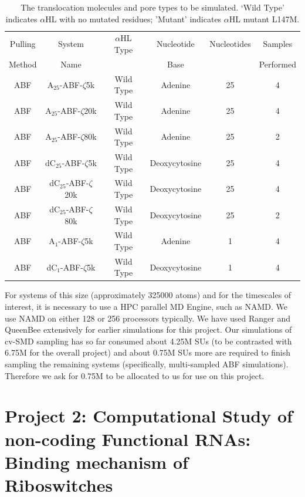 \documentclass[a4paper,10pt]{article}
\newcommand{\dctfnsp}{dC$_{25}$}
\newcommand{\atfnsp}{A$_{25}$}
\newcommand{\dconsp}{dC$_{1}$}
\newcommand{\aonsp}{A$_{1}$}
\newcommand{\ahl}{$\alpha$HL }
\begin{document}
\begin{table}[!h]
\begin{center}
  \caption{The translocation molecules and pore types to be simulated. `Wild Type' indicates \ahl with no mutated residues; 'Mutant' indicates \ahl mutant L147M.\newline }
\label{table:systems2}
\begin{tabular}{| c | c | c | c | c | c |}
\hline
Pulling & System & \ahl Type & Nucleotide & Nucleotides & Samples \\
Method & Name &  & Base &  & Performed \\
\hline
ABF & \atfnsp-ABF-$\zeta$5k & Wild Type & Adenine & 25 & 4  \\
ABF & \atfnsp-ABF-$\zeta$20k & Wild Type & Adenine & 25 & 4  \\
ABF & \atfnsp-ABF-$\zeta$80k & Wild Type & Adenine & 25 & 2  \\
ABF & \dctfnsp-ABF-$\zeta$5k & Wild Type & Deoxycytosine & 25 & 4  \\
ABF & \dctfnsp-ABF-$\zeta$20k & Wild Type & Deoxycytosine & 25 & 4  \\
ABF & \dctfnsp-ABF-$\zeta$80k & Wild Type & Deoxycytosine & 25 & 2 \\
ABF & \aonsp-ABF-$\zeta$5k & Wild Type & Adenine & 1 & 4  \\
ABF & \dconsp-ABF-$\zeta$5k & Wild Type & Deoxycytosine & 1 & 4  \\
\hline
\end{tabular}
\end{center}
\end{table}

For systems of this size (approximately 325000 atoms) and for the timescales of interest, it is necessary to use a HPC parallel MD Engine, such as NAMD.  We use NAMD on either 128 or 256 processors typically. We have used Ranger and QueenBee extensively for earlier simulations for this project. Our simulations of cv-SMD sampling has so far consumed about 4.25M SUs (to be contrasted with 6.75M for the overall project) and about 0.75M SUs more are required to finish sampling the remaining systems (specifically, multi-sampled ABF simulations).  Therefore we ask for  0.75M to be allocated to us for use on this project.


\section*{Project 2: Computational Study of non-coding Functional RNAs: Binding mechanism of Riboswitches}
\end{document}
